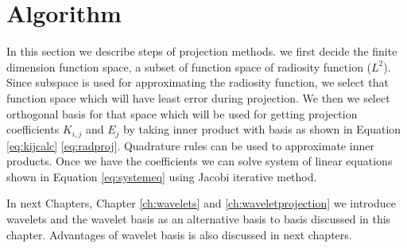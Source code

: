 \section{Algorithm}
In this section we describe steps of projection methods.
we first decide the finite dimension function space, a subset of function space of radiosity function ($L^2$). Since subspace is used for approximating the radiosity function, we select that function space which will have least error during  projection.  We then we select orthogonal basis for that space which will be used for getting projection coefficients $K_{i,j}$ and $E_{j}$ by taking inner product with basis as shown in Equation \ref{eq:kijcalc} \ref{eq:radproj}. Quadrature rules can be used to approximate inner products. Once we have the coefficients  we can solve system of linear equations shown in Equation \ref{eq:systemeq} using Jacobi iterative method. 


In next Chapters, Chapter \ref{ch:wavelets} and \ref{ch:waveletprojection} we introduce wavelets and the wavelet basis as an alternative basis to basis discussed in this chapter. Advantages of wavelet basis is also discussed in next chapters.
